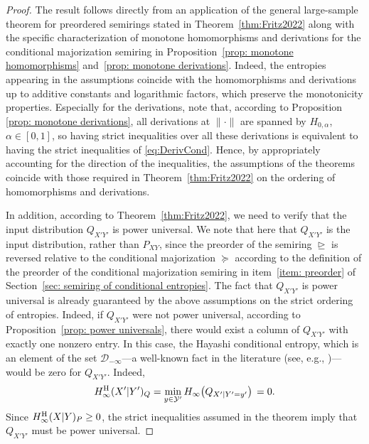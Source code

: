 \documentclass[aps,pra,11pt,onecolumn,nofootinbib,tightenlines]{revtex4-2}
\theoremstyle{definition}
\newcommand{\rgeq}{\trianglerighteq}
\begin{document}
\begin{proof}
The result follows directly from an application of the general large-sample theorem for preordered semirings stated in Theorem~\ref{thm:Fritz2022} along with the specific characterization of monotone homomorphisms and derivations for the conditional majorization semiring in Proposition~\ref{prop: monotone homomorphisms} and~\ref{prop: monotone derivations}. Indeed, the entropies appearing in the assumptions coincide with the homomorphisms and derivations up to additive constants and logarithmic factors, which preserve the monotonicity properties. Especially for the derivations, note that, according to Proposition \ref{prop: monotone derivations}, all derivations at $\|\cdot\|$ are spanned by $H_{0,\alpha}$, $\alpha\in[0,1]$, so having strict inequalities over all these derivations is equivalent to having the strict inequalities of \eqref{eq:DerivCond}. Hence, by appropriately accounting for the direction of the inequalities, the assumptions of the theorems coincide with those required in Theorem~\ref{thm:Fritz2022} on the ordering of homomorphisms and derivations.

In addition, according to Theorem~\ref{thm:Fritz2022}, we need to verify that the input distribution $Q_{X'Y'}$ is power universal. We note that here that \(Q_{X'Y'}\) is the input distribution, rather than \(P_{XY}\), since the preorder of the semiring \(\rgeq\) is reversed relative to the conditional majorization \(\succeq\) according to the definition of the preorder of the conditional majorization semiring in item~\ref{item: preorder} of Section~\ref{sec: semiring of conditional entropies}.
The fact that $Q_{X'Y'}$ is power universal is already guaranteed by the above assumptions on the strict ordering of entropies. Indeed, if $Q_{X'Y'}$ were not power universal, according to Proposition~\ref{prop: power universals}, there would exist a column of $Q_{X'Y'}$ with exactly one nonzero entry.
In this case, the Hayashi conditional entropy, which is an element of the set \(\mathcal{D}_{-\infty}\)—a well-known fact in the literature (see, e.g., \cite{gour2024inevitability})— would be zero for $Q_{X'Y'}$. Indeed,
\begin{equation}
    H^{\rm{H}}_{\infty}(X'|Y')_Q = \min_{y \in \mathcal{Y}'}  H_{\infty}\bigl(Q_{X'|Y'=y'}\bigr) \, = 0.
\end{equation}
Since $ H^{\rm{H}}_{\infty}(X|Y)_P\geq0$, the strict inequalities assumed in the theorem imply that $Q_{X'Y'}$ must be power universal.
\end{proof}
\end{document}
